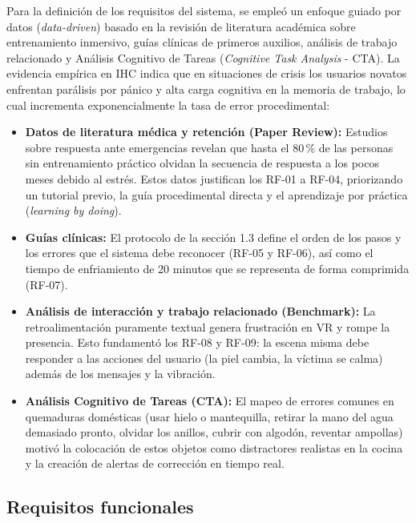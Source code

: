 \documentclass[11pt,letterpaper]{article}
\begin{document}
Para la definición de los requisitos del sistema, se empleó un enfoque guiado por datos (\textit{data-driven}) basado en la revisión de literatura académica sobre entrenamiento inmersivo, guías clínicas de primeros auxilios, análisis de trabajo relacionado y Análisis Cognitivo de Tareas (\textit{Cognitive Task Analysis} - CTA). La evidencia empírica en IHC indica que en situaciones de crisis los usuarios novatos enfrentan parálisis por pánico y alta carga cognitiva en la memoria de trabajo, lo cual incrementa exponencialmente la tasa de error procedimental:

\begin{itemize}
  \item \textbf{Datos de literatura médica y retención (Paper Review):} Estudios sobre respuesta ante emergencias revelan que hasta el 80\,\% de las personas sin entrenamiento práctico olvidan la secuencia de respuesta a los pocos meses debido al estrés. Estos datos justifican los RF-01 a RF-04, priorizando un tutorial previo, la guía procedimental directa y el aprendizaje por práctica (\textit{learning by doing}).
  \item \textbf{Guías clínicas:} El protocolo de la sección 1.3 define el orden de los pasos y los errores que el sistema debe reconocer (RF-05 y RF-06), así como el tiempo de enfriamiento de 20 minutos que se representa de forma comprimida (RF-07).
  \item \textbf{Análisis de interacción y trabajo relacionado (Benchmark):} La retroalimentación puramente textual genera frustración en VR y rompe la presencia. Esto fundamentó los RF-08 y RF-09: la escena misma debe responder a las acciones del usuario (la piel cambia, la víctima se calma) además de los mensajes y la vibración.
  \item \textbf{Análisis Cognitivo de Tareas (CTA):} El mapeo de errores comunes en quemaduras domésticas (usar hielo o mantequilla, retirar la mano del agua demasiado pronto, olvidar los anillos, cubrir con algodón, reventar ampollas) motivó la colocación de estos objetos como distractores realistas en la cocina y la creación de alertas de corrección en tiempo real.
\end{itemize}

\subsection{Requisitos funcionales}
\end{document}
